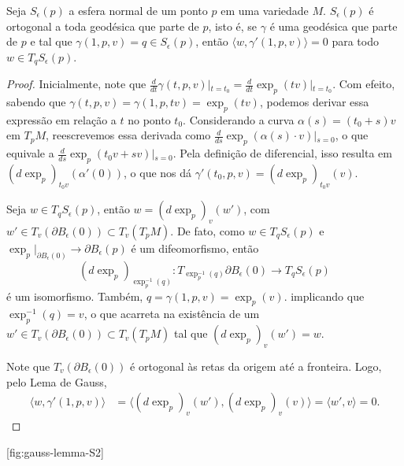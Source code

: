 \begin{proposition}
    \label{prop:esfera-ortogonal-geodesicas}
    Seja $S_{\epsilon}(p)$ a esfera normal de um ponto $p$ em uma variedade $M$. $S_{\epsilon}(p)$ é ortogonal a toda geodésica que parte de $p$, isto é, se $\gamma$ é uma geodésica que parte de $p$ e tal que $\gamma(1, p, v) = q \in S_\epsilon(p)$, então  $\langle w, \gamma'(1, p, v) \rangle = 0$ para todo $w \in T_q S_\epsilon(p)$.
    \begin{proof}

        Inicialmente, note que $\frac{d}{dt} \gamma(t, p, v) \big\vert{}_{t=t_0} = \frac{d}{dt} \exp_p(tv) \big\vert{}_{t=t_0}$. Com efeito, sabendo que $\gamma(t, p, v) = \gamma(1, p, tv) = \exp_p(tv)$, podemos derivar essa expressão em relação a $t$ no ponto $t_0$. Considerando a curva $\alpha(s) = (t_0 + s)v$ em $T_pM$, reescrevemos essa derivada como $\frac{d}{ds} \exp_p(\alpha(s) \cdot v) \big\vert{}_{s=0}$, o que equivale a $\frac{d}{ds} \exp_p(t_0v + sv) \big\vert{}_{s=0}$. Pela definição de diferencial, isso resulta em $(d\exp_p)_{t_0v}(\alpha'(0))$, o que nos dá $\gamma'(t_0, p, v) = (d\exp_p)_{t_0v}(v)$.

        Seja $w \in T_q S_\epsilon(p)$, então $w = (d\exp_p)_v(w')$, com $w' \in T_v(\partial B_\epsilon(0)) \subset T_v(T_pM)$.
        De fato, como $w \in T_q S_\epsilon(p)$ e $\exp_p|_{\partial B_\epsilon(0)} \to \partial B_\epsilon(p)$ é um difeomorfismo, então
        \begin{equation*}
            (d\exp_p)_{\exp_p^{-1}(q)} : T_{\exp_p^{-1}(q)} \partial B_\epsilon(0) \to T_q S_{\epsilon}(p)
        \end{equation*}
        é um isomorfismo. Também, $q = \gamma(1, p, v) = \exp_p(v)$. implicando que $\exp_p^{-1}(q) = v$, o que acarreta na existência de um $w' \in T_v(\partial B_\epsilon(0)) \subset T_v(T_pM)$ tal que $(d\exp_p)_v(w') = w$.

        Note que $T_v(\partial B_\epsilon(0))$ é ortogonal às retas da origem até a fronteira.
        Logo, pelo Lema de Gauss,
        \begin{align*}
            \langle w, \gamma'(1, p, v) \rangle & = \langle (d\exp_p)_v (w'), (d\exp_p)_v (v) \rangle  = \langle w', v \rangle  = 0.
        \end{align*}
    \end{proof}
\end{proposition}

[fig:gauss-lemma-S2]

